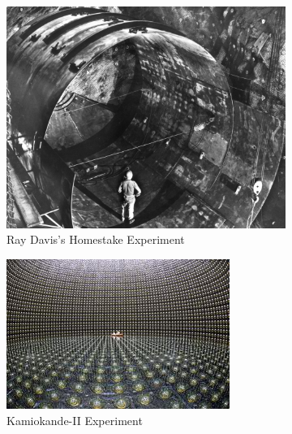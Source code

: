 \begin{figure}[htp]
\centering
	\begin{subfigure}[b]{.3\textwidth}
    \includegraphics[width=\textwidth]{figs/homestake.jpg}
    \caption{Ray Davis's Homestake Experiment \cite{raydavis}}
    \label{fig:homestake}
    \end{subfigure}
    \quad
    \begin{subfigure}[b]{.3\textwidth}
    \includegraphics[width=\textwidth]{figs/kamiokande.jpg}
    \caption{Kamiokande-II Experiment \cite{kamiokande}}
    \label{fig:kamiokande}
    \end{subfigure}
    \quad
    \begin{subfigure}[b]{.3\textwidth}

\end{subfigure}
\end{figure}
